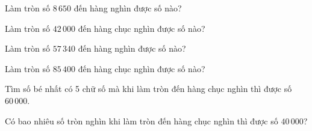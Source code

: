 \begin{ex} %
Làm tròn số $8\,650$ đến hàng nghìn được số nào?
\end{ex}

\begin{ex} %
Làm tròn số $42\,000$ đến hàng chục nghìn được số nào?
\end{ex}

\begin{ex} %
Làm tròn số $57\,340$ đến hàng nghìn được số nào?
\end{ex}

\begin{ex} %
Làm tròn số $85\,400$ đến hàng chục nghìn được số nào?
\end{ex}

\begin{ex} %
Tìm số bé nhất có 5 chữ số mà khi làm tròn đến hàng chục nghìn thì được số $60\,000$.
\end{ex}

\begin{ex} %
Có bao nhiêu số tròn nghìn khi làm tròn đến hàng chục nghìn thì được số $40\,000$?
\end{ex}
